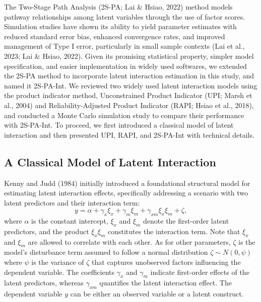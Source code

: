 \documentclass[
  man]{apa6}
\begin{document}
The Two-Stage Path Analysis (2S-PA; Lai \& Hsiao, 2022) method models pathway relationships among latent variables through the use of factor scores. Simulation studies have shown its ability to yield parameter estimates with reduced standard error bias, enhanced convergence rates, and improved management of Type I error, particularly in small sample contexts (Lai et al., 2023; Lai \& Hsiao, 2022). Given its promising statistical property, simpler model specification, and easier implementation in widely used softwares, we extended the 2S-PA method to incorporate latent interaction estimation in this study, and named it 2S-PA-Int. We reviewed two widely used latent interaction models using the product indicator method, Unconstrained Product Indicator (UPI; Marsh et al., 2004) and Reliability-Adjusted Product Indicator (RAPI; Hsiao et al., 2018), and conducted a Monte Carlo simulation study to compare their performance with 2S-PA-Int. To proceed, we first introduced a classical model of latent interaction and then presented UPI, RAPI, and 2S-PA-Int with technical details.

\hypertarget{a-classical-model-of-latent-interaction}{%
\subsection{A Classical Model of Latent Interaction}\label{a-classical-model-of-latent-interaction}}

Kenny and Judd (1984) initially introduced a foundational structural model for estimating latent interaction effects, specifically addressing a scenario with two latent predictors and their interaction term:
\begin{equation}
y = \alpha + \gamma_{x}\xi_{x} + \gamma_{m}\xi_{m} + \gamma_{xm}\xi_{x}\xi_{m} + \zeta,
\end{equation}
where \(\alpha\) is the constant intercept, \(\xi_{x}\) and \(\xi_{m}\) denote the first-order latent predictors, and the product \(\xi_{x}\xi_{m}\) constitutes the interaction term. Note that \(\xi_{x}\) and \(\xi_{m}\) are allowed to correlate with each other. As for other parameters, \(\zeta\) is the model's disturbance term assumed to follow a normal distribution \(\zeta \sim N(0, \psi)\) where \(\psi\) is the variance of \(\zeta\) that captures unobserved factors influencing the dependent variable. The coefficients \(\gamma_{x}\) and \(\gamma_{m}\) indicate first-order effects of the latent predictors, whereas \(\gamma_{xm}\) quantifies the latent interaction effect. The dependent variable \(y\) can be either an observed variable or a latent construct.
\end{document}
